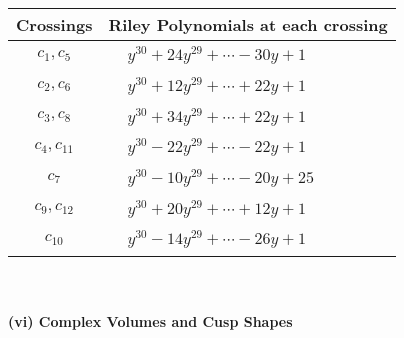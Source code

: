 \documentclass[1p]{elsarticle_modified}
\theoremstyle{definition}
\begin{document}
\begin{tabular}{m{50pt}|m{274pt}}
Crossings & \hspace{64pt}Riley Polynomials at each crossing \\
\hline $$\begin{aligned}c_{1},c_{5}\end{aligned}$$&$\begin{aligned}
&y^{30}+24 y^{29}+\cdots-30 y+1
\end{aligned}$\\
\hline $$\begin{aligned}c_{2},c_{6}\end{aligned}$$&$\begin{aligned}
&y^{30}+12 y^{29}+\cdots+22 y+1
\end{aligned}$\\
\hline $$\begin{aligned}c_{3},c_{8}\end{aligned}$$&$\begin{aligned}
&y^{30}+34 y^{29}+\cdots+22 y+1
\end{aligned}$\\
\hline $$\begin{aligned}c_{4},c_{11}\end{aligned}$$&$\begin{aligned}
&y^{30}-22 y^{29}+\cdots-22 y+1
\end{aligned}$\\
\hline $$\begin{aligned}c_{7}\end{aligned}$$&$\begin{aligned}
&y^{30}-10 y^{29}+\cdots-20 y+25
\end{aligned}$\\
\hline $$\begin{aligned}c_{9},c_{12}\end{aligned}$$&$\begin{aligned}
&y^{30}+20 y^{29}+\cdots+12 y+1
\end{aligned}$\\
\hline $$\begin{aligned}c_{10}\end{aligned}$$&$\begin{aligned}
&y^{30}-14 y^{29}+\cdots-26 y+1
\end{aligned}$\\
\hline
\end{tabular}\\~\\
\newpage\flushleft \textbf{(vi) Complex Volumes and Cusp Shapes}
\end{document}

